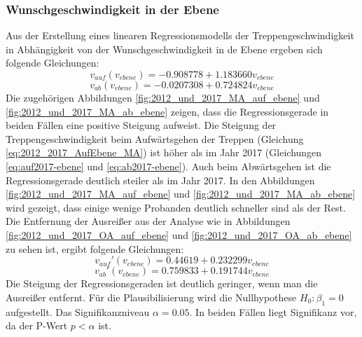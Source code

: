 \subsubsection{Wunschgeschwindigkeit in der Ebene}
Aus der Erstellung eines linearen Regressionsmodells der Treppengeschwindigkeit in Abhängigkeit von der Wunschgeschwindigkeit in de Ebene ergeben sich folgende Gleichungen:
\begin{equation}
v_{auf}(v_{ebene}) = -0.908778 + 1.183660 v_{ebene}
\label{eq:2012_2017_AufEbene_MA}
\end{equation}
\begin{equation}
v_{ab}(v_{ebene}) = -0.0207308+0.724824 v_{ebene}
\label{eq:2012_2017_AbEbene_MA}
\end{equation}
Die zugehörigen Abbildungen \ref{fig:2012_und_2017_MA_auf_ebene} und \ref{fig:2012_und_2017_MA_ab_ebene} zeigen, dass die Regressionsgerade in beiden Fällen eine positive Steigung aufweist. Die Steigung der Treppengeschwindigkeit beim Aufwärtsgehen der Treppen (Gleichung \ref{eq:2012_2017_AufEbene_MA}) ist höher als im Jahr 2017 (Gleichungen \ref{eq:auf2017-ebene} und \ref{eq:ab2017-ebene}). Auch beim Abwärtsgehen ist die Regressionsgerade deutlich steiler als im Jahr 2017. In den Abbildungen \ref{fig:2012_und_2017_MA_auf_ebene} und \ref{fig:2012_und_2017_MA_ab_ebene} wird gezeigt, dass einige wenige Probanden deutlich schneller sind als der Rest. Die Entfernung der Ausreißer aus der Analyse wie in Abbildungen \ref{fig:2012_und_2017_OA_auf_ebene} und \ref{fig:2012_und_2017_OA_ab_ebene} zu sehen ist, ergibt folgende Gleichungen: 
\begin{equation}
v_{auf}'(v_{ebene}) = 0.44619 +0.232299 v_{ebene}
\label{eq:2012_2017_AufEbene_OA}
\end{equation}
\begin{equation}
v_{ab}'(v_{ebene}) = 0.759833 +0.191744 v_{ebene}
\label{eq:2012_2017_AbEbene_OA}
\end{equation}
Die Steigung der Regressionsgeraden ist deutlich geringer, wenn man die Ausreißer entfernt. 
Für die Plausibilisierung wird die Nullhypothese $H_0: \beta_1 = 0$ aufgestellt. Das Signifikanzniveau $\alpha= 0.05$. In beiden Fällen liegt Signifikanz vor, da der P-Wert $p<\alpha$ ist.

